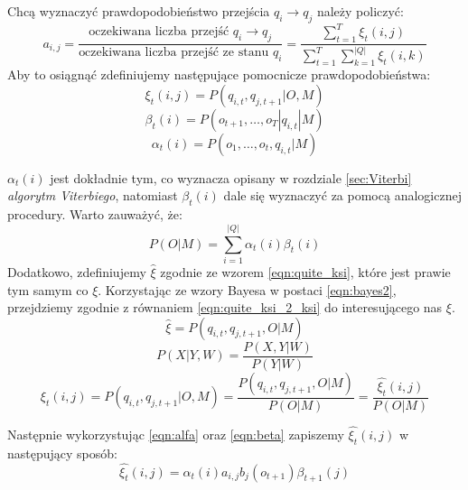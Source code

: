 \documentclass[shortabstract, mgr]{iithesis}
\begin{document}
	   Chcą wyznaczyć prawdopodobieństwo przejścia $q_i \rightarrow q_j$ należy policzyć:
	   \begin{equation}
		    a_{i,j}=\frac{\text{oczekiwana liczba przejść } q_i \rightarrow q_j}{\text{oczekiwana liczba przejść ze stanu } q_i} = \frac{\sum_{t=1}^T 	\xi_t(i,j)}{\sum_{t=1}^T \sum_{k=1}^{|Q|}	\xi_t(i,k)}
		    \label{eqn:qi_qj}
	   \end{equation}
	   Aby to osiągnąć zdefiniujemy następujące pomocnicze prawdopodobieństwa:
	   \begin{equation}
			\xi_t(i,j)=P(q_{i,t}, q_{j,t+1}|O,M)
			\label{eqn:ksi}
	   \end{equation}
	   \begin{equation}
	   	    \beta_t(i)=P(o_{t+1}, \ldots, o_T|q_{i,t}|M)
	   	    \label{eqn:beta}
	   \end{equation}
	   \begin{equation}
			\alpha_t(i)=P(o_1, \ldots, o_{t},q_{i,t}|M)
			\label{eqn:alfa}
	   \end{equation}
	   
	   $\alpha_t(i)$ jest dokładnie tym, co wyznacza opisany w rozdziale \ref{sec:Viterbi} \textit{algorytm Viterbiego}, natomiast $\beta_t(i)$ dale się wyznaczyć za pomocą analogicznej procedury. Warto zauważyć, że:
	   \begin{equation}
		   P(O|M) = \sum_{i=1}^{|Q|}\alpha_t(i)\beta_t(i)
	   \end{equation}
	   Dodatkowo, zdefiniujemy $\hat{\xi}$ zgodnie ze wzorem \ref{eqn:quite_ksi}, które jest prawie tym samym co $\xi$. Korzystając ze wzory Bayesa w postaci \ref{eqn:bayes2}, przejdziemy zgodnie z równaniem \ref{eqn:quite_ksi_2_ksi} do interesującego nas $\xi$.
	   \begin{equation}
	       \hat{\xi} = P(q_{i,t}, q_{j,t+1},O|M)
	       \label{eqn:quite_ksi}
	   \end{equation}
	   \begin{equation}
	        P(X|Y,W) = \frac{P(X,Y|W)}{P(Y|W)}
	        \label{eqn:bayes2}
	   \end{equation}
	   \begin{equation}
			\xi_t(i,j)=P(q_{i,t}, q_{j,t+1}|O,M) = \frac{P(q_{i,t}, q_{j,t+1},O|M)}{P(O|M)}= \frac{\hat{\xi_t}(i,j)}{P(O|M)}
			\label{eqn:quite_ksi_2_ksi}
		\end{equation}
		
		Następnie wykorzystując \ref{eqn:alfa} oraz \ref{eqn:beta} zapiszemy $\hat{\xi_t}(i,j)$ w następujący sposób:
		\begin{equation}
			\hat{\xi_t}(i,j) = \alpha_t(i) a_{i,j} b_j(o_{t+1}) \beta_{t+1}(j)
		\end{equation}
		
\end{document}
